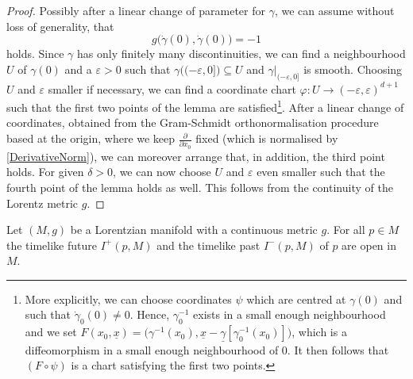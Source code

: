 \documentclass[reqno]{article}
\newcommand{\ux}{\underline{x}}
\begin{document}
\begin{proof}
Possibly after a linear change of parameter for $\gamma$, we can assume without loss of generality, that
\begin{equation}
\label{DerivativeNorm}
g\big(\dot{\gamma}(0),\dot{\gamma}(0)\big) = -1
\end{equation}
holds. Since $\gamma$ has only finitely many discontinuities, we can find a neighbourhood $U$ of $\gamma(0)$ and a $\varepsilon >0$ such that $\gamma \big((-\varepsilon, 0]\big) \subseteq U$ and $\gamma\big|_{(-\varepsilon,0]}$ is smooth. Choosing $U$ and $\varepsilon$ smaller if necessary, we can find a coordinate chart $\varphi : U \to  (-\varepsilon , \varepsilon)^{d+1}$ such that the first two points of the lemma are satisfied\footnote{More explicitly, we can choose coordinates $\psi$ which are centred at $\gamma(0)$ and such that $\dot{\gamma}_0(0) \neq 0$. Hence, $\gamma^{-1}_0$ exists in a small enough neighbourhood and we set $F(x_0, \ux) = \big(\gamma^{-1}(x_0), \ux - \underline{\gamma}[\gamma_0^{-1}(x_0)]\big)$, which is a diffeomorphism in a small enough neighbourhood of $0$. It then follows that $(F\circ \psi)$ is a chart satisfying the first two points.}.
After a linear change of coordinates, obtained from the Gram-Schmidt orthonormalisation procedure based at the origin, where we keep $\frac{\partial}{\partial x_0}$ fixed (which is normalised by \eqref{DerivativeNorm}), we can moreover arrange that, in addition, the third point holds.  For given $\delta >0$, we can now choose $U$ and $\varepsilon$ even smaller such that the fourth point of the lemma holds as well. This follows from the continuity of the Lorentz metric $g$.
\end{proof}


\begin{proposition}
\label{FutureOpen}
Let $(M,g)$ be a Lorentzian manifold with a continuous metric $g$. For all $p \in M$ the timelike future $I^+(p,M)$ and the timelike past $I^-(p,M)$ of $p$ are open in $M$.
\end{proposition}
\end{document}
